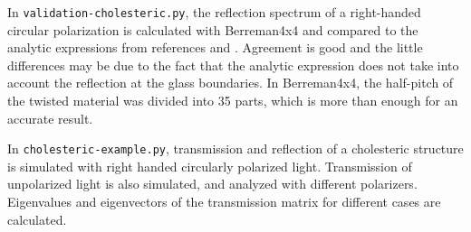 In \verb/validation-cholesteric.py/, the reflection spectrum of a right-handed circular polarization is calculated with Berreman4x4 and compared to the analytic expressions from references  and .
Agreement is good and the little differences may be due to the fact that the analytic expression does not take into account the reflection at the glass boundaries.
In Berreman4x4, the half-pitch of the twisted material was divided into 35 parts, which is more than enough for an accurate result.

In \verb/cholesteric-example.py/, transmission and reflection of a cholesteric structure is simulated with right handed circularly polarized light.
Transmission of unpolarized light is also simulated, and analyzed with different polarizers.
Eigenvalues and eigenvectors of the transmission matrix for different cases are calculated.


